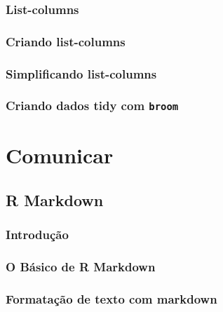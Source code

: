 \documentclass[
]{latex/krantz}
\theoremstyle{definition}
\theoremstyle{definition}
\theoremstyle{definition}
\theoremstyle{definition}
\theoremstyle{remark}
\begin{document}
\hypertarget{list-columns}{%
\section{List-columns}\label{list-columns}}

\hypertarget{criando-list-columns}{%
\section{Criando list-columns}\label{criando-list-columns}}

\hypertarget{simplificando-list-columns}{%
\section{Simplificando list-columns}\label{simplificando-list-columns}}

\hypertarget{criando-dados-tidy-com-broom}{%
\section{\texorpdfstring{Criando dados tidy com \texttt{broom}}{Criando dados tidy com broom}}\label{criando-dados-tidy-com-broom}}

\hypertarget{part-comunicar}{%
\part{Comunicar}\label{part-comunicar}}

\hypertarget{r-markdown}{%
\chapter{R Markdown}\label{r-markdown}}

\hypertarget{introduuxe7uxe3o-17}{%
\section{Introdução}\label{introduuxe7uxe3o-17}}

\hypertarget{o-buxe1sico-de-r-markdown}{%
\section{O Básico de R Markdown}\label{o-buxe1sico-de-r-markdown}}

\hypertarget{formatauxe7uxe3o-de-texto-com-markdown}{%
\section{Formatação de texto com markdown}\label{formatauxe7uxe3o-de-texto-com-markdown}}
\end{document}
